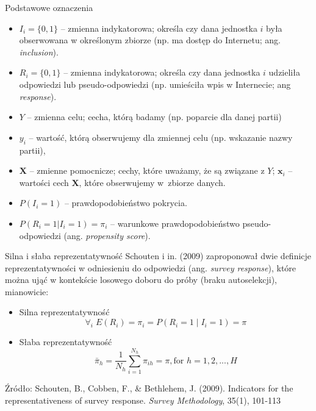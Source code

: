 \documentclass[10pt,ignorenonframetext, aspectratio=169]{beamer}
\newcommand{\bX}{\boldsymbol{X}}
\newcommand{\bx}{\boldsymbol{x}}
\begin{document}
\begin{frame}{Podstawowe oznaczenia}

\begin{itemize}
    \item $I_i = \{0, 1\}$ -- zmienna indykatorowa; określa czy dana jednostka $i$ była obserwowana w określonym zbiorze (np. ma dostęp do Internetu; ang. \textit{inclusion}).
    \item $R_i = \{0, 1\}$ -- zmienna indykatorowa; określa czy dana jednostka $i$ udzieliła odpowiedzi lub pseudo-odpowiedzi (np. umieściła wpis w Internecie; ang \textit{response}).
    \item $Y$ -- zmienna celu; cecha, którą badamy (np. poparcie dla danej partii)
    \item $y_i$ -- wartość, którą obserwujemy dla zmiennej celu (np. wskazanie nazwy partii),
    \item $\bX$ -- zmienne pomocnicze; cechy, które uważamy, że są związane z $Y$; $\bx_i$ -- wartości cech $\bX$, które obserwujemy w~zbiorze danych.
    \item $P(I_i=1)$ -- prawdopodobieństwo pokrycia.
    \item $P(R_i=1 | I_i=1) = \pi_i$ -- warunkowe prawdopodobieństwo pseudo-odpowiedzi (ang. \textit{propensity score}).
\end{itemize}
\end{frame}

\begin{frame}{Silna i słaba reprezentatywność}
    Schouten i in. (2009) zaproponował dwie definicje reprezentatywności w odniesieniu do odpowiedzi (ang. \textit{survey response}), które można ująć w kontekście losowego doboru do próby (braku autoselekcji), mianowicie:

\begin{itemize}
    \item Silna reprezentatywność
    \begin{equation}
  	\forall_i \; E(R_i) = \pi_i = P( R_i  = 1  \mid  I_i = 1) = \pi
	\label{def-strong} 
	\end{equation}
	\item Słaba reprezentatywność
	\begin{equation}
	    \bar{\pi}_h  = \frac{1}{N_h}\sum_{i=1}^{N_h} \pi_{ih} = \pi, \mbox{for $h=1,2,...,H$}
    \label{def-weak}
	\end{equation}
\end{itemize}

\small{Źródło: Schouten, B., Cobben, F., \& Bethlehem, J. (2009). Indicators for the representativeness of survey response. \textit{Survey Methodology}, 35(1), 101-113}

\end{frame}
\end{document}
